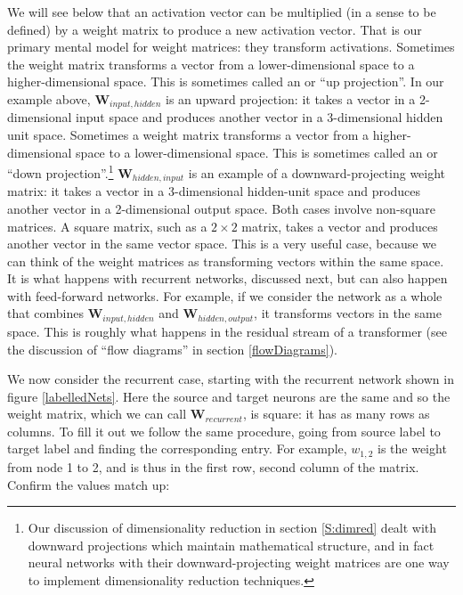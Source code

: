 We will see below that an activation vector can be multiplied (in a sense to be defined) by a weight matrix to produce a new activation vector. That is our primary mental model for weight matrices: they transform activations. Sometimes the weight matrix transforms a vector from a lower-dimensional space to a higher-dimensional space. This is sometimes called an  or ``up projection''. In our example above, $\textbf{W}_{input, hidden}$ is an upward projection: it takes a vector in a 2-dimensional input space and produces another vector in a 3-dimensional hidden unit space. Sometimes a weight matrix  transforms a vector from a higher-dimensional space to a lower-dimensional space. This is sometimes called an  or ``down projection''.\footnote{Our discussion of dimensionality reduction in section \ref{S:dimred} dealt with downward projections which maintain mathematical structure, and in fact neural networks with their downward-projecting weight matrices are one way to implement dimensionality reduction techniques.} $\textbf{W}_{hidden, input}$ is an example of a downward-projecting weight matrix: it takes a vector in a 3-dimensional hidden-unit space and produces another vector in a 2-dimensional output space. Both cases involve non-square matrices. A square matrix, such as a $2 \times 2$ matrix, takes a vector and produces another vector in the same vector space. This is a very useful case, because we can think of the weight matrices as transforming vectors within the same space. It is what happens with recurrent networks, discussed next, but can also happen with feed-forward networks. For example, if we consider the network as a whole that combines  $\textbf{W}_{input, hidden}$ and  $\textbf{W}_{hidden, output}$, it transforms vectors in the same space. This is roughly what happens in the residual stream of a transformer (see the discussion of ``flow diagrams'' in section \ref{flowDiagrams}).

We now consider the recurrent case, starting with the recurrent network shown in figure \ref{labelledNets}. Here the source and target neurons are the same and so the weight matrix, which we can call $\textbf{W}_{recurrent}$, is square: it has as many rows as columns. To fill it out we follow the same procedure, going from source label to target label and finding the corresponding entry. For example, $w_{1,2}$ is the weight from node 1 to 2, and is thus in the first row, second column of the matrix. Confirm the values match up:

